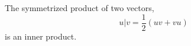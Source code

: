 \begin{lemma}\label{l:inner-product}
	The symmetrized product of two vectors, \[u|v = \frac{1}{2}(uv + vu)\] is an inner product.
\end{lemma}
